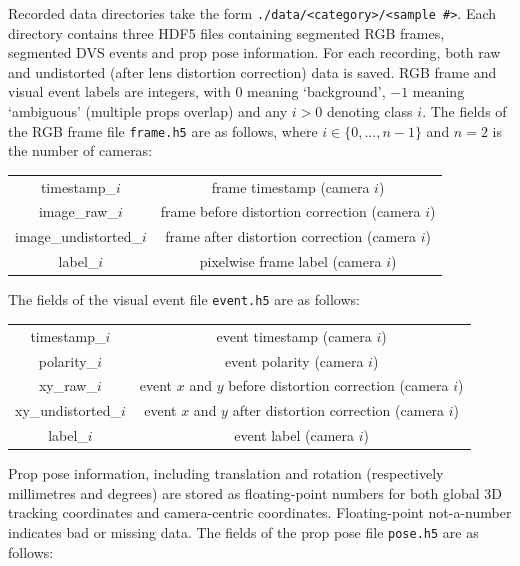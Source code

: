 \documentclass{article}
\begin{document}
Recorded data directories take the form \lstinline|./data/<category>/<sample #>|. Each directory contains three HDF5 files containing segmented RGB frames, segmented DVS events and prop pose information. For each recording, both raw and undistorted (after lens distortion correction) data is saved. RGB frame and visual event labels are integers, with $0$ meaning `background', $-1$ meaning `ambiguous' (multiple props overlap) and any $i > 0$ denoting class $i$. The fields of the RGB frame file \lstinline|frame.h5| are as follows, where $i \in \{0,...,n-1\}$ and $n = 2$ is the number of cameras:
\begin{center}
	\begin{tabular}{|c|c|}
		timestamp\_$i$           & frame timestamp (camera $i$) \\
		image\_raw\_$i$          & frame before distortion correction (camera $i$) \\
		image\_undistorted\_$i$  & frame after distortion correction (camera $i$) \\
		label\_$i$               & pixelwise frame label (camera $i$) \\
	\end{tabular}
\end{center}
The fields of the visual event file \lstinline|event.h5| are as follows:
\begin{center}
	\begin{tabular}{|c|c|}
		timestamp\_$i$        & event timestamp (camera $i$) \\
		polarity\_$i$         & event polarity (camera $i$) \\
		xy\_raw\_$i$          & event $x$ and $y$ before distortion correction (camera $i$) \\
		xy\_undistorted\_$i$  & event $x$ and $y$ after distortion correction (camera $i$) \\
		label\_$i$            & event label (camera $i$) \\
	\end{tabular}
\end{center}
Prop pose information, including translation and rotation (respectively millimetres and degrees) are stored as floating-point numbers for both global 3D tracking coordinates and camera-centric coordinates. Floating-point not-a-number indicates bad or missing data. The fields of the prop pose file \lstinline|pose.h5| are as follows:
\end{document}

